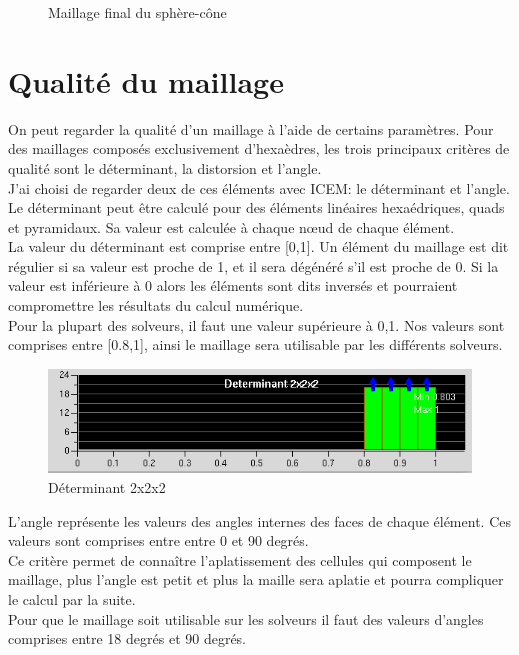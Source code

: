 \begin{figure}[H]
\begin{center}
\begin{subfigure}{0.6\textwidth}
\label{fig:subim2}
\end{subfigure}
\caption{Maillage final du sphère-cône}
\label{fig:image2}
\end{center}
\end{figure}

\section{ Qualité du maillage}

On peut regarder la qualité d’un maillage à l'aide de certains paramètres. Pour des maillages composés exclusivement d'hexaèdres, les trois principaux critères de qualité sont le déterminant, la distorsion et l'angle.\\
J'ai choisi de regarder deux de ces éléments avec ICEM: le déterminant et l'angle.\\

Le déterminant peut être calculé pour des éléments linéaires hexaédriques, quads et pyramidaux. Sa valeur est calculée à chaque nœud de chaque élément.\\
La valeur du déterminant est comprise entre [0,1]. Un élément du maillage est dit régulier si sa valeur est proche de 1, et il sera dégénéré s’il est proche de 0. Si la valeur est inférieure à 0 alors les éléments sont dits inversés et pourraient compromettre les résultats du calcul numérique.\\
Pour la plupart des solveurs, il faut une valeur supérieure à 0,1. Nos valeurs sont comprises entre [0.8,1], ainsi le maillage sera utilisable par les différents solveurs.


\begin{figure}[H]
\begin{center}
\includegraphics[width=\textwidth]{chapter1_introduction/pictures/icem/castest_fluid_solid/det2.PNG}
\caption{Déterminant 2x2x2}
\end{center}
\end{figure}




L'angle représente les valeurs des angles internes des faces de chaque élément. Ces valeurs sont comprises entre entre 0 et 90 degrés.\\
Ce critère permet de connaître l'aplatissement des cellules qui composent le maillage, plus l'angle est petit et plus la maille sera aplatie et pourra compliquer le calcul par la suite.\\
Pour que le maillage soit utilisable sur les solveurs il faut des valeurs d’angles comprises entre 18 degrés et 90 degrés.


